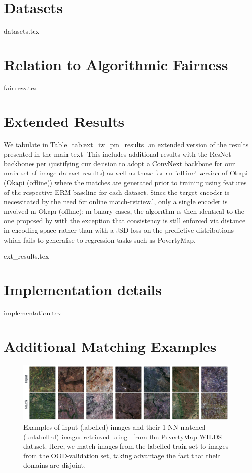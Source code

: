 \appendix
\section{Datasets}\label{appx:datasets}
{datasets.tex}

\section{Relation to Algorithmic Fairness}\label{appx:fairness}
{fairness.tex}

\section{Extended Results}\label{appx:ext_results}

We tabulate in Table~\ref{tab:ext_iw_pm_results} an extended version of the results presented in
the main text. This includes additional results with the ResNet backbones per
\cite{SagWeiLeeGaoetal22} (justifying our decision to adopt a ConvNext backbone for our main set of
image-dataset results) as well as those for an 'offline' version of Okapi (Okapi (offline)) where
the matches are generated prior to training using features of the respective ERM baseline for each
dataset. Since the target encoder is necessitated by the need for online match-retrieval, only a
single encoder is involved in  Okapi (offline); in binary cases, the algorithm is then identical to
the one proposed by \cite{RomInsShaQua22} with the exception that consistency is still enforced via
distance in encoding space rather than with a JSD loss on the predictive distributions which fails
to generalise to regression tasks such as PovertyMap.

{ext_results.tex}

\section{Implementation details}\label{appx:implementation}
{implementation.tex}

\section{Additional Matching Examples}\label{appx:additional_matches}

\begin{figure}[ht!]
  \centering
  \includegraphics[width=1.\textwidth]{figures/matches_examples_pm.pdf}
  \caption{Examples of input (labelled) images and their 1-NN matched (unlabelled) images retrieved using \CNN\ from the PovertyMap-WILDS dataset. Here, we match images from the labelled-train set to images from the OOD-validation set, taking advantage the fact that their domains are disjoint.
  }
 \end{figure}
 
